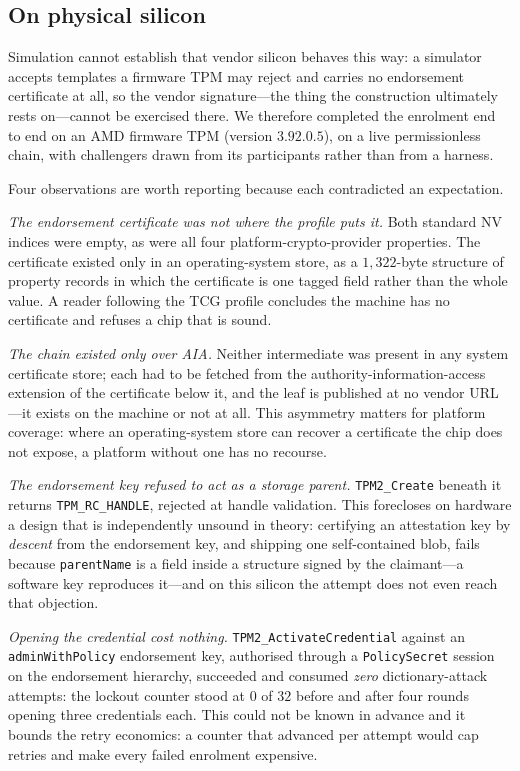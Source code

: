 \documentclass[conference,10pt]{IEEEtran}
\begin{document}
\subsection{On physical silicon}
\label{sec:silicon}

Simulation cannot establish that vendor silicon behaves this way: a simulator accepts templates a
firmware TPM may reject and carries no endorsement certificate at all, so the vendor signature---the
thing the construction ultimately rests on---cannot be exercised there. We therefore completed the
enrolment end to end on an AMD firmware TPM (version $3.92.0.5$), on a live permissionless chain, with
challengers drawn from its participants rather than from a harness.

Four observations are worth reporting because each contradicted an expectation.

\emph{The endorsement certificate was not where the profile puts it.} Both standard NV indices were
empty, as were all four platform-crypto-provider properties. The certificate existed only in an
operating-system store, as a $1{,}322$-byte structure of property records in which the certificate is one
tagged field rather than the whole value. A reader following the TCG profile concludes the machine has no
certificate and refuses a chip that is sound.

\emph{The chain existed only over AIA.} Neither intermediate was present in any system certificate store;
each had to be fetched from the authority-information-access extension of the certificate below it, and
the leaf is published at no vendor URL---it exists on the machine or not at all. This asymmetry matters
for platform coverage: where an operating-system store can recover a certificate the chip does not
expose, a platform without one has no recourse.

\emph{The endorsement key refused to act as a storage parent.} \texttt{TPM2\_Create} beneath it returns
\texttt{TPM\_RC\_HANDLE}, rejected at handle validation. This forecloses on hardware a design that is
independently unsound in theory: certifying an attestation key by \emph{descent} from the endorsement
key, and shipping one self-contained blob, fails because \texttt{parentName} is a field inside a
structure signed by the claimant---a software key reproduces it---and on this silicon the attempt does
not even reach that objection.

\emph{Opening the credential cost nothing.} \texttt{TPM2\_ActivateCredential} against an
\texttt{adminWithPolicy} endorsement key, authorised through a \texttt{PolicySecret} session on the
endorsement hierarchy, succeeded and consumed \emph{zero} dictionary-attack attempts: the lockout counter
stood at $0$ of $32$ before and after four rounds opening three credentials each. This could not be known
in advance and it bounds the retry economics: a counter that advanced per attempt would cap retries and
make every failed enrolment expensive.
\end{document}
